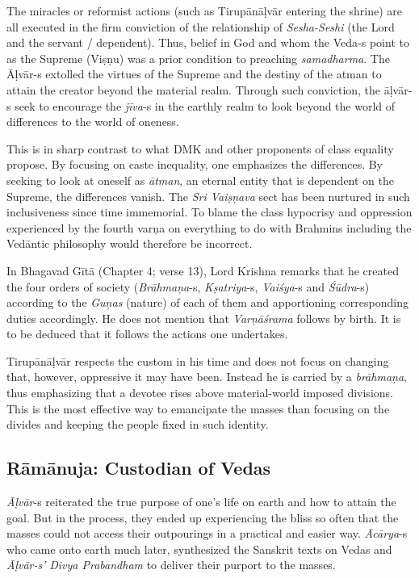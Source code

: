 The miracles or reformist actions (such as Tirupānāḷvār entering the shrine) are all executed in the firm conviction of the relationship of \textit{Sesha-Seshi} (the Lord and the servant / dependent). Thus, belief in God and whom the Veda-s point to as the Supreme (Viṣṇu) was a prior condition to preaching \textit{samadharma}. The Āḷvār-s extolled the virtues of the Supreme and the destiny of the atman to attain the creator beyond the material realm. Through such conviction, the āḷvār-s seek to encourage the \textit{jīva}-s in the earthly realm to look beyond the world of differences to the world of oneness.

This is in sharp contrast to what DMK and other proponents of class equality propose. By focusing on caste inequality, one emphasizes the differences. By seeking to look at oneself as \textit{ātman}, an eternal entity that is dependent on the Supreme, the differences vanish. The \textit{Sri Vaiṣņava} sect has been nurtured in such inclusiveness since time immemorial. To blame the class hypocrisy and oppression experienced by the fourth varņa on everything to do with Brahmins including the Vedāntic philosophy would therefore be incorrect.

In Bhagavad Gītā (Chapter 4; verse 13), Lord Krishna remarks that he created the four orders of society (\textit{Brāhmaņa}-s, \textit{Kṣatriya}-s, \textit{Vaiśya}-s and \textit{Śūdra}-s) according to the \textit{Guņas} (nature) of each of them and apportioning corresponding duties accordingly. He does not mention that \textit{Varņāśrama} follows by birth. It is to be deduced that it follows the actions one undertakes.

Tirupānāḷvār respects the custom in his time and does not focus on changing that, however, oppressive it may have been. Instead he is carried by a \textit{brāhmaņa}, thus emphasizing that a devotee rises above material-world imposed divisions. This is the most effective way to emancipate the masses than focusing on the divides and keeping the people fixed in such identity.


\subsection*{Rāmānuja: Custodian of Vedas}

\textit{Āḷvār}-s reiterated the true purpose of one’s life on earth and how to attain the goal. But in the process, they ended up experiencing the bliss so often that the masses could not access their outpourings in a practical and easier way. \textit{Ācārya}-s who came onto earth much later, synthesized the Sanskrit texts on Vedas and \textit{Āḷvār-s’ }\textit{Divya Prabandham} to deliver their purport to the masses.

